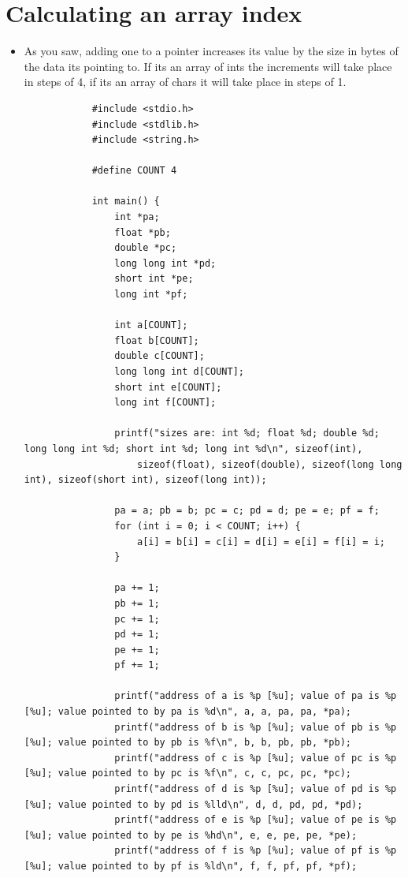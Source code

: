 \section{Calculating an array index}
\begin{itemize}
    \item As you saw, adding one to a pointer increases its value by the size in bytes of the data its pointing to. If its an array of ints the increments will take place in steps of 4, if its an array of chars it will take place in steps of 1.
        \begin{verbatim}
            #include <stdio.h>
            #include <stdlib.h>
            #include <string.h>

            #define COUNT 4

            int main() {
                int *pa;
                float *pb;
                double *pc;
                long long int *pd;
                short int *pe; 
                long int *pf;

                int a[COUNT];
                float b[COUNT];
                double c[COUNT];
                long long int d[COUNT];
                short int e[COUNT];
                long int f[COUNT];

                printf("sizes are: int %d; float %d; double %d; long long int %d; short int %d; long int %d\n", sizeof(int),
                    sizeof(float), sizeof(double), sizeof(long long int), sizeof(short int), sizeof(long int));

                pa = a; pb = b; pc = c; pd = d; pe = e; pf = f;
                for (int i = 0; i < COUNT; i++) {
                    a[i] = b[i] = c[i] = d[i] = e[i] = f[i] = i;
                }

                pa += 1;
                pb += 1;
                pc += 1;
                pd += 1;
                pe += 1;
                pf += 1;

                printf("address of a is %p [%u]; value of pa is %p [%u]; value pointed to by pa is %d\n", a, a, pa, pa, *pa);
                printf("address of b is %p [%u]; value of pb is %p [%u]; value pointed to by pb is %f\n", b, b, pb, pb, *pb);
                printf("address of c is %p [%u]; value of pc is %p [%u]; value pointed to by pc is %f\n", c, c, pc, pc, *pc);
                printf("address of d is %p [%u]; value of pd is %p [%u]; value pointed to by pd is %lld\n", d, d, pd, pd, *pd);
                printf("address of e is %p [%u]; value of pe is %p [%u]; value pointed to by pe is %hd\n", e, e, pe, pe, *pe);
                printf("address of f is %p [%u]; value of pf is %p [%u]; value pointed to by pf is %ld\n", f, f, pf, pf, *pf);


\end{verbatim}
\end{itemize}
